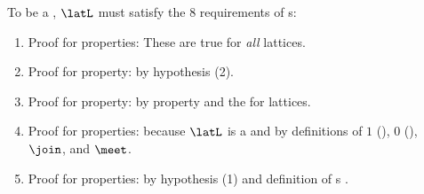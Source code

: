 \begin{proofns}
To be a , $\latL$ must satisfy the 8 requirements of s:
\begin{enumerate}
  \item Proof for  properties: These are true for \emph{all} lattices.
  \item Proof for  property: by hypothesis (2).
  \item Proof for  property: by  property and 
        the  for lattices.
  \item Proof for  properties: because $\latL$ is a 
        and by definitions of $1$ (), $0$ (), $\join$, and $\meet$.
  \item Proof for  properties: by hypothesis (1) and definition of s .
\end{enumerate}
\end{proofns}

